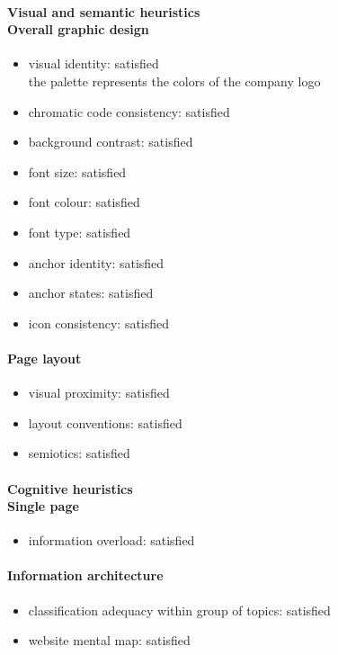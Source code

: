 \begin{enumerate}
	\paragraph*{Visual and semantic heuristics \\ Overall graphic design }
	\begin{itemize}
		\item visual identity: satisfied\\
		the palette represents the colors of the company logo
		\item chromatic code consistency: satisfied
		\item background contrast: satisfied
		\item font size: satisfied
		\item font colour: satisfied
		\item font type: satisfied
		\item anchor identity: satisfied
		\item anchor states: satisfied
		\item icon consistency: satisfied
	\end{itemize}
	
	\paragraph*{Page layout}
	\begin{itemize}
		\item visual proximity: satisfied
		\item layout conventions: satisfied
		\item semiotics: satisfied
	\end{itemize}	
	
	\paragraph*{Cognitive heuristics \\ Single page}
	\begin{itemize}
		\item information overload: satisfied
	\end{itemize}	
	
	\paragraph*{Information architecture}
	\begin{itemize}
		\item classification adequacy within group of topics: satisfied
		\item website mental map: satisfied
	\end{itemize}


\end{enumerate}
